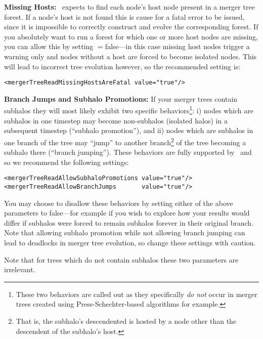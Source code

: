{\normalfont \bfseries Missing Hosts:} \glc\ expects to find each \gls{node}'s host \gls{node} present in a merger tree \gls{forest}. If a \gls{node}'s host is not found this is cause for a fatal error to be issued, since it is impossible to correctly construct and evolve the corresponding \gls{forest}. If you absolutely want to run a \gls{forest} for which one or more host \glspl{node} are missing, you can allow this by setting {\normalfont \ttfamily [mergerTreeReadMissingHostsAreFatal]}$=${\normalfont \ttfamily false}---in this case missing host \glspl{node} trigger a warning only and \glspl{node} without a host are forced to become isolated \glspl{node}. This will lead to incorrect tree evolution however, so the recommended setting is:
\begin{verbatim}
<mergerTreeReadMissingHostsAreFatal value="true"/>
\end{verbatim}

{\normalfont \bfseries Branch Jumps and Subhalo Promotions:} If your merger trees contain subhalos they will most likely exhibit two specific behaviors\footnote{These two behaviors are called out as they specifically \emph{do not} occur in merger trees created using Press-Schechter-based algorithms for example.}: i) \glspl{node} which are subhalos in one timestep may become non-subhalos (isolated halos) in a subsequent timestep (``subhalo promotion''), and ii) \glspl{node} which are subhalos in one branch of the tree may ``jump'' to another branch\footnote{That is, the subhalo's descendented is hosted by a \gls{node} other than the descendent of the subhalo's host.} of the tree becoming a subhalo there (``branch jumping''). These behaviors are fully supported by \glc\ and so we recommend the following settings:
\begin{verbatim}
<mergerTreeReadAllowSubhaloPromotions value="true"/>
<mergerTreeReadAllowBranchJumps       value="true"/>
\end{verbatim}
You may choose to disallow these behaviors by setting either of the above parameters to {\normalfont \ttfamily false}---for example if you wish to explore how your results would differ if subhalos were forced to remain subhalos forever in their original branch. Note that allowing subhalo promotion while not allowing branch jumping can lead to \glspl{deadlock} in merger tree evolution, so change these settings with caution.

Note that for trees which do not contain subhalos these two parameters are irrelevant.

